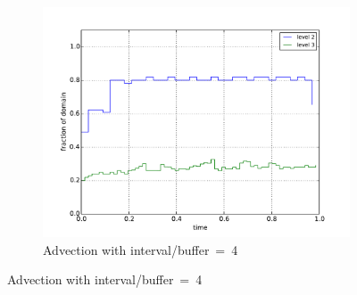 \documentclass[11pt]{article}
\begin{document}
\begin{figure}[!htb]
\centering
	\begin{subfigure}[b]{0.65\textwidth}
		\caption{Advection with interval/buffer~=~4}
		\includegraphics[width=\textwidth]{myclaw/cells_advec_4}
	\end{subfigure}
	

\end{figure}
\end{document}
